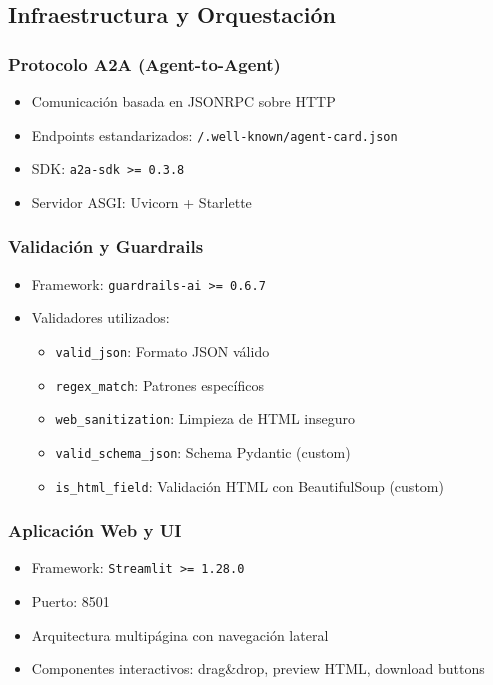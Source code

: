 \documentclass[12pt,a4paper]{article}
\begin{document}
\subsection{Infraestructura y Orquestación}

\subsubsection{Protocolo A2A (Agent-to-Agent)}
\begin{itemize}
    \item Comunicación basada en JSONRPC sobre HTTP
    \item Endpoints estandarizados: \texttt{/.well-known/agent-card.json}
    \item SDK: \texttt{a2a-sdk >= 0.3.8}
    \item Servidor ASGI: Uvicorn + Starlette
\end{itemize}

\subsubsection{Validación y Guardrails}
\begin{itemize}
    \item Framework: \texttt{guardrails-ai >= 0.6.7}
    \item Validadores utilizados:
    \begin{itemize}
        \item \texttt{valid\_json}: Formato JSON válido
        \item \texttt{regex\_match}: Patrones específicos
        \item \texttt{web\_sanitization}: Limpieza de HTML inseguro
        \item \texttt{valid\_schema\_json}: Schema Pydantic (custom)
        \item \texttt{is\_html\_field}: Validación HTML con BeautifulSoup (custom)
    \end{itemize}
\end{itemize}

\subsubsection{Aplicación Web y UI}
\begin{itemize}
    \item Framework: \texttt{Streamlit >= 1.28.0}
    \item Puerto: 8501
    \item Arquitectura multipágina con navegación lateral
    \item Componentes interactivos: drag\&drop, preview HTML, download buttons
\end{itemize}
\end{document}
